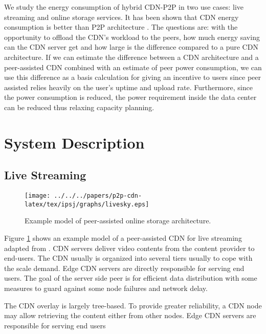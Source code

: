 We study the energy consumption of hybrid CDN-P2P in two use cases: live streaming and online storage services.  
It has been shown that CDN energy consumption is better than P2P architecture \cite{feldmann2010energy,baliga2007energy}. 
The questions are: with the opportunity to offload the CDN’s workload to the peers, how much energy saving can the CDN server get and how large is the difference compared to a pure CDN architecture.  
If we can estimate the difference between a CDN architecture and a peer-assisted CDN combined with an estimate of peer power consumption, we can use this difference as a basis calculation for giving an incentive to users since peer assisted relies heavily on the user’s uptime and upload rate. 
Furthermore, since the power consumption is reduced, the power requirement inside the data center can be reduced thus relaxing capacity planning. 


\section{System Description}\label{sec:system model}
\subsection{Live Streaming}

\begin{figure}[tb]
\begin{center}
\texttt{[image: ../../../papers/p2p-cdn-latex/tex/ipsj/graphs/livesky.eps]}
\end{center}
\caption{Example model of peer-assisted online storage architecture.}
\label{fig:iptv}
\end{figure} 

Figure \ref{fig:iptv} shows an example model of a peer-assisted CDN for live streaming adapted from \cite{Yin:2010:LEC:1823746.1823750}. 
CDN servers deliver video contents from the content provider to end-users. 
The CDN usually is organized into several tiers usually to cope with the scale demand. 
Edge CDN servers are directly responsible for serving end users. 
The goal of the server side peer is for efficient data distribution with some measures to guard against some node failures and network delay.

The CDN overlay is largely tree-based. 
To provide greater reliability, a CDN node may allow retrieving the content either from other nodes. 
Edge CDN servers are responsible for serving end users

